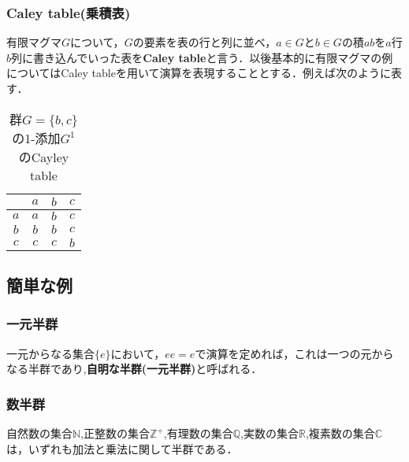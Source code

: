 \documentclass{jsarticle}
\begin{document}
\subsubsection{Caley table(乗積表)}
有限マグマ$G$について，$G$の要素を表の行と列に並べ，$a\in G$と$b\in G$の積$ab$を$a$行$b$列に書き込んでいった表を{\bf Caley table}と言う．以後基本的に有限マグマの例についてはCaley tableを用いて演算を表現することとする．例えば次のように表す．
\begin{table}[htb]
\begin{center}
\begin{tabular}{c|ccc}
 &$a$&$b$&$c$ \\ \hline
$a$&$a$&$b$&$c$ \\
$b$&$b$&$b$&$c$ \\
$c$&$c$&$c$&$b$    
\end{tabular}
\caption{群$G=\{b,c\}$の1-添加$G^1$のCayley table}
\end{center}
\end{table}
\newline
\subsection{簡単な例}
\subsubsection{一元半群}
一元からなる集合$\{e\}$において，$ee=e$で演算を定めれば，これは一つの元からなる半群であり,{\bf 自明な半群(一元半群)}と呼ばれる．
\subsubsection{数半群}
自然数の集合$\mathbb N$,正整数の集合$\mathbb Z^+$,有理数の集合$\mathbb Q$,実数の集合$\mathbb R$,複素数の集合$\mathbb C$は，いずれも加法と乗法に関して半群である．
\end{document}
